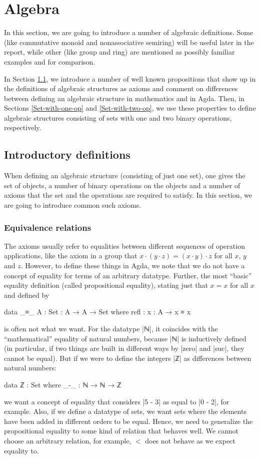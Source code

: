 \section{Algebra}
\label{Algebra}
\label{Section:Algebra}
In this section, we are going to introduce a number of algebraic definitions. Some (like commutative monoid and nonassociative semiring) will be useful later in the report, while other (like group and ring) are mentioned as possibly familiar examples and for comparison.

In Section \ref{Intro-defs}, we introduce a number of well known propositions that show up in the definitions of algebraic structures as axioms and comment on differences between defining an algebraic structure in mathematics and in Agda. Then, in Sections \ref{Set-with-one-op} and \ref{Set-with-two-op}, we use these properties to define algebraic structures consisting of sets with one and two binary operations, respectively.
\subsection{Introductory definitions}
\label{Intro-defs}
When defining an algebraic structure (consisting of just one set), one gives the set of objects, a number of binary operations on the objects and a number of axioms that the set and the operations are required to satisfy. In this section, we are going to introduce common such axioms. 
\subsubsection{Equivalence relations}
\label{Algebra-equality}
The axioms usually refer to equalities between different sequences of operation applications, like the axiom in a group that $x \cdot (y \cdot z) = (x \cdot y) \cdot z$ for all $x$, $y$ and $z$. However, to define these things in Agda, we note that we do not have a concept of equality for terms of an arbitrary datatype. Further, the most ``basic'' equality definition (called propositional equality), stating just that $x = x$ for all $x$ and defined by
\begin{code}
data _≡_ {A : Set} : A → A → Set where
  refl : {x : A} → x ≡ x
\end{code}
is often not what we want. For the datatype |ℕ|, it coincides with the ``mathematical'' equality of natural numbers, because |ℕ| is inductively defined (in particular, if two things are built in different ways by |zero| and |suc|, they cannot be equal). But if we were to define the integers |ℤ| as differences between natural numbers:
\begin{code}
data ℤ : Set where
  _-_ : ℕ → ℕ → ℤ
\end{code}
we want a concept of equality that considers |5 - 3| as equal to |0 - 2|, for example. Also, if we define a datatype of sets, we want sets where the elements have been added in different orders to be equal. Hence, we need to generalize the propositional equality to some kind of relation that behaves well. We cannot choose an arbitrary relation, for example, $<$ does not behave as we expect equality to. 

